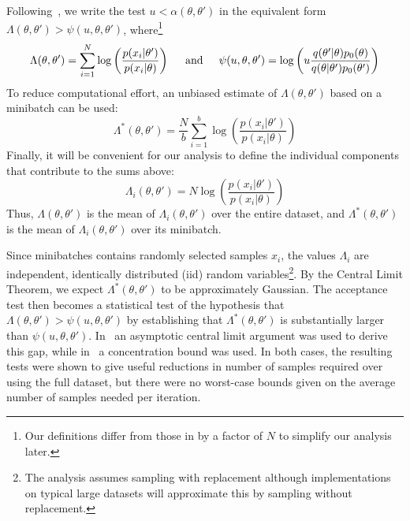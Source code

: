 \documentclass{article}
\begin{document}
Following~\cite{icml2014c1_bardenet14}, we write the test $u <
\alpha(\theta,\theta')$ in the equivalent form $\Lambda(\theta,\theta') >
\psi(u,\theta,\theta')$, where\footnote{Our definitions differ from those in
\cite{icml2014c1_bardenet14} by a factor of $N$ to simplify our analysis later.}
\begin{equation}
\Lambda(\theta,\theta') = \sum_{i=1}^N \log\left(\frac{p(x_i|\theta')}{p(x_i|\theta)}\right)  
\hspace{0.2in} {\rm and} \hspace{0.2in}
\psi(u,\theta,\theta') = \log\left(u\frac{q(\theta'|\theta)p_0(\theta)}{q(\theta|\theta')p_0(\theta')}\right)
\end{equation}
To reduce computational effort, an unbiased estimate of $\Lambda(\theta,\theta')$
based on a minibatch can be used:
\begin{equation}
\Lambda^*(\theta,\theta') = \frac{N}{b}\sum_{i=1}^b \log\left(\frac{p(x_i|\theta')}{p(x_i|\theta)}\right)  
\end{equation}
Finally, it will be convenient for our analysis to define the individual
components that contribute to the sums above:
\begin{equation}\label{eq:individual_terms}
\Lambda_i(\theta,\theta') = N \log\left(\frac{p(x_i|\theta')}{p(x_i|\theta)}\right)  
\end{equation}
Thus, $\Lambda(\theta,\theta')$ is the mean of $\Lambda_i(\theta,\theta')$ over
the entire dataset, and $\Lambda^*(\theta,\theta')$ is the mean of
$\Lambda_i(\theta,\theta')$ over its minibatch. 

Since minibatches contains randomly selected samples $x_i$, the values
$\Lambda_i$ are independent, identically distributed (iid) random
variables\footnote{The analysis assumes sampling with replacement
although implementations on typical large datasets will approximate
this by sampling without replacement.}.
By the Central Limit Theorem, we expect $\Lambda^*(\theta,\theta')$ to
be approximately Gaussian. The acceptance test then becomes a
statistical test of the hypothesis that
$\Lambda(\theta,\theta')>\psi(u,\theta,\theta')$ by establishing that
$\Lambda^*(\theta,\theta')$ is substantially larger than
$\psi(u,\theta,\theta')$.  In~\cite{cutting_mh_2014} an asymptotic
central limit argument was used to derive this gap, while
in~\cite{icml2014c1_bardenet14} a concentration bound was used. In
both cases, the resulting tests were shown to give useful reductions
in number of samples required over using the full dataset, but there
were no worst-case bounds given on the average number of samples
needed per iteration.
\end{document}
